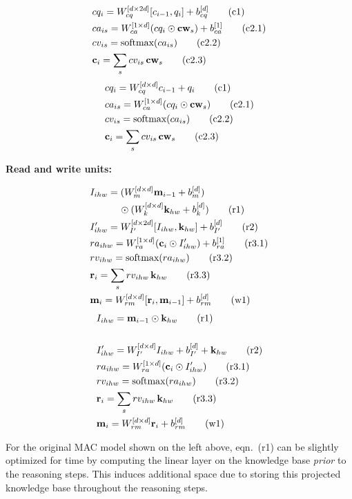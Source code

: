 \begin{multicols}{2}
	\noindent
	\begin{align*}
	&cq_i = W_{cq}^{[d \times 2d]} [c_{i-1}, q_i] + b_{cq}^{[d]}  \tag{c1} \\
	&ca_{is} = W_{ca}^{[1 \times d]} (cq_i \odot \mathbf{cw}_s) + b_{ca}^{[1]}
	\tag{c2.1}\\
	&cv_{is} = \textrm{softmax}(ca_{is}) \tag{c2.2}\\
	&\mathbf{c}_i = \sum_s cv_{is} \, \mathbf{cw}_s  \tag{c2.3}
	\end{align*}
	\columnbreak
	{\color{Plum}
	\begin{align*}
	&cq_i = W_{cq}^{[d \times d]} c_{i-1} + q_i  \tag{c1} \\
	&ca_{is} = W_{ca}^{[1 \times d]} (cq_i \odot \mathbf{cw}_s)  \tag{c2.1}\\
	&cv_{is} = \textrm{softmax}(ca_{is}) \tag{c2.2}\\
	&\mathbf{c}_i = \sum_s cv_{is} \, \mathbf{cw}_s  \tag{c2.3}
    \end{align*}}
\end{multicols}

\noindent\textbf{Read and write units:}
\begin{multicols}{2}
	\noindent
	\begin{align*}
	&I_{ihw} = (W_{m}^{[d \times d]} \mathbf{m}_{i-1} + b_{m}^{[d]}) \\
	           & \qquad \quad \odot (W_{k}^{[d \times d]} \mathbf{k}_{hw} + b_{k}^{[d]}) \tag{r1} \\
	&I'_{ihw} =  W_{I'}^{[d \times 2d]} [I_{ihw},\mathbf{k}_{hw}]  + b_{I'}^{[d]}  \tag{r2} \\
	&ra_{ihw} = W_{ra}^{[1 \times d]} (\mathbf{c}_i \odot I'_{ihw}) + b_{ra}^{[1]} \tag{r3.1}\\
	&rv_{ihw} = \textrm{softmax}(ra_{ihw}) \tag{r3.2}\\
	&\mathbf{r}_i = \sum_s rv_{ihw} \, \mathbf{k}_{hw}  \tag{r3.3}\\
	&\mathbf{m}_i = W_{rm}^{[d \times d]} [\mathbf{r}_i, \mathbf{m}_{i-1}]  + b_{rm}^{[d]} \tag{w1}	
	\end{align*}
	\columnbreak
	{\color{Plum}
	\begin{align*}
	&I_{ihw} = \mathbf{m}_{i-1} \odot \mathbf{k}_{hw} \tag{r1} \\ \\
	&I'_{ihw} = W_{I'}^{[d \times d]} I_{ihw} + b_{I'}^{[d]} + \mathbf{k}_{hw} \tag{r2} \\
	&ra_{ihw} = W_{ra}^{[1 \times d]} (\mathbf{c}_i \odot I'_{ihw})  \tag{r3.1}\\
	&rv_{ihw} = \textrm{softmax}(ra_{ihw}) \tag{r3.2}\\
	&\mathbf{r}_i = \sum_s rv_{ihw} \, \mathbf{k}_{hw}  \tag{r3.3}\\
	&\mathbf{m}_i = W_{rm}^{[d \times d]} \mathbf{r}_i + b_{rm}^{[d]} \tag{w1}
	\end{align*}}
\end{multicols}
For the original MAC model shown on the left above, eqn.~(r1) can be slightly optimized for time
by computing the linear layer on the knowledge base \emph{prior} to the reasoning steps.
This induces additional space due to storing this projected knowledge base throughout the
reasoning steps.

